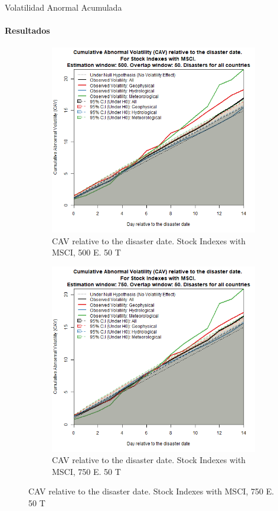 \documentclass{beamer}
\begin{document}
\begin{frame}{Volatilidad Anormal Acumulada}
\framesubtitle{Resultados}
\begin{figure}
    \begin{subfigure}{0.5\textwidth}
        \includegraphics[width=0.9\linewidth]{../Graficos_Paper/CAV/Ag/indices_benchmark_CAV_Est_500_tra_50.png}
        \caption{CAV relative to the disaster date. Stock Indexes with MSCI, 500 E. 50 T}
        \label{figure:cavind50050}
    \end{subfigure}%
    \begin{subfigure}{0.5\textwidth}
        \includegraphics[width=0.9\linewidth]{../Graficos_Paper/CAV/Ag/indices_benchmark_CAV_Est_750_tra_50.png}
        \caption{CAV relative to the disaster date. Stock Indexes with MSCI, 750 E. 50 T}
        \label{figure:cavind75050}
    \end{subfigure}
\end{figure}
\end{frame}
\end{document}
